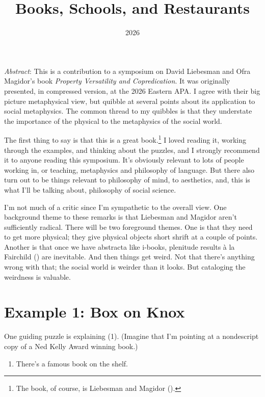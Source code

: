 \documentclass[
  11pt,
  letterpaper,
  DIV=11,
  numbers=noendperiod,
  twoside]{scrartcl}
\title{Books, Schools, and Restaurants}
\author{}
\date{2026}
\providecommand{\tightlist}{%
  \setlength{\itemsep}{0pt}\setlength{\parskip}{0pt}}
\renewenvironment{abstract}
 {\vspace{-1.25cm}
 \quotation\small\noindent\emph{Abstract}:}
 {\endquotation}
\renewenvironment{abstract}
 {\quotation\small\noindent\emph{Abstract}:}
 {\endquotation\vspace{-0.02cm}}
\begin{document}
\maketitle
\begin{abstract}
This is a contribution to a symposium on David Liebesman and Ofra
Magidor's book \emph{Property Versatility and Copredication}. It was
originally presented, in compressed version, at the 2026 Eastern APA. I
agree with their big picture metaphysical view, but quibble at several
points about its application to social metaphysics. The common thread to
my quibbles is that they understate the importance of the physical to
the metaphysics of the social world.
\end{abstract}


The first thing to say is that this is a great book.\footnote{The book,
  of course, is Liebesman and Magidor ().} I
loved reading it, working through the examples, and thinking about the
puzzles, and I strongly recommend it to anyone reading this symposium.
It's obviously relevant to lots of people working in, or teaching,
metaphysics and philosophy of language. But there also turn out to be
things relevant to philosophy of mind, to aesthetics, and, this is what
I'll be talking about, philosophy of social science.

I'm not much of a critic since I'm sympathetic to the overall view. One
background theme to these remarks is that Liebesman and Magidor aren't
sufficiently radical. There will be two foreground themes. One is that
they need to get more physical; they give physical objects short shrift
at a couple of points. Another is that once we have abstracta like
i-books, plenitude results à la Fairchild
() are inevitable. And then things get
weird. Not that there's anything wrong with that; the social world is
weirder than it looks. But cataloging the weirdness is valuable.

\section{Example 1: Box on Knox}\label{example-1-box-on-knox}

One guiding puzzle is explaining (1). (Imagine that I'm pointing at a
nondescript copy of a Ned Kelly Award winning book.)

\begin{enumerate}
\def\labelenumi{(\arabic{enumi})}
\tightlist
\item
  There's a famous book on the shelf.
\end{enumerate}
\end{document}
